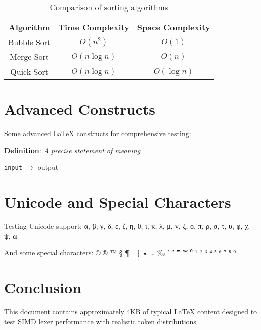 \documentclass{article}
\begin{document}
\begin{table}[h]
\centering
\begin{tabular}{|c|c|c|}
\hline
Algorithm & Time Complexity & Space Complexity \\
\hline
Bubble Sort & $O(n^2)$ & $O(1)$ \\
Merge Sort & $O(n \log n)$ & $O(n)$ \\
Quick Sort & $O(n \log n)$ & $O(\log n)$ \\
\hline
\end{tabular}
\caption{Comparison of sorting algorithms}
\label{tab:sorting}
\end{table}

\section{Advanced Constructs}

Some advanced LaTeX constructs for comprehensive testing:

\newcommand{\customcmd}[2]{\textbf{#1}: \textit{#2}}
\customcmd{Definition}{A precise statement of meaning}

\def\mydef#1#2{\texttt{#1} $\rightarrow$ #2}
\mydef{input}{output}

\section{Unicode and Special Characters}

Testing Unicode support: α, β, γ, δ, ε, ζ, η, θ, ι, κ, λ, μ, ν, ξ, ο, π, ρ, σ, τ, υ, φ, χ, ψ, ω

And some special characters: © ® ™ § ¶ † ‡ • … ‰ ′ ″ ‴ ⁗ ⁰ ¹ ² ³ ⁴ ⁵ ⁶ ⁷ ⁸ ⁹

\section{Conclusion} \label{sec:conclusion}

This document contains approximately 4KB of typical \LaTeX{} content designed to test 
SIMD lexer performance with realistic token distributions.
\end{document}

